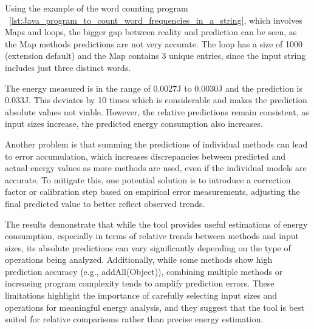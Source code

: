 Using the example of the word counting program ~\ref{lst:Java_program_to_count_word_frequencies_in_a_string}, which involves Maps and loops, the bigger gap between reality and prediction can be seen, as the Map methods predictions are not very accurate. The loop has a size of 1000 (extension default) and the Map contains 3 unique entries, since the input string includes just three distinct words.

The energy measured is in the range of 0.0027J to 0.0030J and the prediction is 0.033J. This deviates by 10 times which is considerable and makes the prediction absolute values not viable. However, the relative predictions remain consistent, as input sizes increase, the predicted energy consumption also increases.

Another problem is that summing the predictions of individual methods can lead to error accumulation, which increases discrepancies between predicted and actual energy values as more methods are used, even if the individual models are accurate. To mitigate this, one potential solution is to introduce a correction factor or calibration step based on empirical error measurements, adjusting the final predicted value to better reflect observed trends.

The results demonstrate that while the tool provides useful estimations of energy consumption, especially in terms of relative trends between methods and input sizes, its absolute predictions can vary significantly depending on the type of operations being analyzed. Additionally, while some methods show high prediction accuracy (e.g., addAll(Object)), combining multiple methods or increasing program complexity tends to amplify prediction errors. These limitations highlight the importance of carefully selecting input sizes and operations for meaningful energy analysis, and they suggest that the tool is best suited for relative comparisons rather than precise energy estimation.










